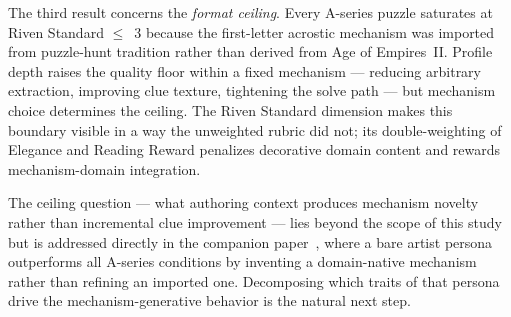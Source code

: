 The third result concerns the \textit{format ceiling}.
Every A-series puzzle saturates at Riven Standard $\leq$~3 because the first-letter acrostic mechanism was imported from puzzle-hunt tradition rather than derived from Age of Empires~II.
Profile depth raises the quality floor within a fixed mechanism --- reducing arbitrary extraction, improving clue texture, tightening the solve path --- but mechanism choice determines the ceiling.
The Riven Standard dimension makes this boundary visible in a way the unweighted rubric did not; its double-weighting of Elegance and Reading Reward penalizes decorative domain content and rewards mechanism-domain integration.

The ceiling question --- what authoring context produces mechanism novelty rather than incremental clue improvement --- lies beyond the scope of this study but is addressed directly in the companion paper~\cite{games-persona-authoring-traits}, where a bare artist persona outperforms all A-series conditions by inventing a domain-native mechanism rather than refining an imported one.
Decomposing which traits of that persona drive the mechanism-generative behavior is the natural next step.
